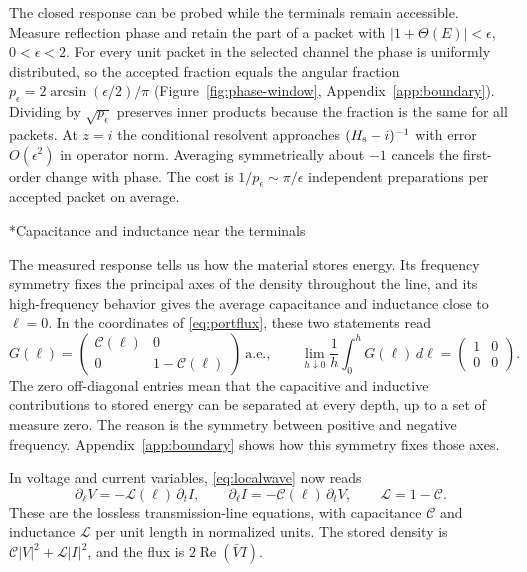 \documentclass[11pt,letterpaper]{article}
\makeatletter
\renewcommand\subsection{\@startsection{subsection}{2}{\z@}{-2.0ex plus -.3ex}{.75ex}{\normalfont\normalsize\itshape}}
\numberwithin{equation}{section}
\makeatother
\begin{document}
The closed response can be probed while the terminals remain accessible. Measure reflection phase and retain the part of a packet with $|1+\Theta(E)|<\epsilon$, $0<\epsilon<2$. For every unit packet in the selected channel the phase is uniformly distributed, so the accepted fraction equals the angular fraction $p_\epsilon=2\arcsin(\epsilon/2)/\pi$ (Figure~\ref{fig:phase-window}, Appendix~\ref{app:boundary}). Dividing by $\sqrt{p_\epsilon}$ preserves inner products because the fraction is the same for all packets. At $z=i$ the conditional resolvent approaches $(H_{\rm s}-i)^{-1}$ with error $O(\epsilon^2)$ in operator norm. Averaging symmetrically about $-1$ cancels the first-order change with phase. The cost is $1/p_\epsilon\sim\pi/\epsilon$ independent preparations per accepted packet on average.

\subsection*{Capacitance and inductance near the terminals}

The measured response tells us how the material stores energy. Its frequency symmetry fixes the principal axes of the density throughout the line, and its high-frequency behavior gives the average capacitance and inductance close to $\ell=0$. In the coordinates of \eqref{eq:portflux}, these two statements read
\begin{equation}
 G(\ell)=\begin{pmatrix}\mathcal C(\ell)&0\\0&1-\mathcal C(\ell)\end{pmatrix}
 \ \text{a.e.},\qquad
 \lim_{h\downarrow0}\frac1h\int_0^h G(\ell)\,d\ell
     =\begin{pmatrix}1&0\\0&0\end{pmatrix}.
 \label{eq:medium}
\end{equation}
The zero off-diagonal entries mean that the capacitive and inductive contributions to stored energy can be separated at every depth, up to a set of measure zero. The reason is the symmetry between positive and negative frequency. Appendix~\ref{app:boundary} shows how this symmetry fixes those axes.

In voltage and current variables, \eqref{eq:localwave} now reads
\begin{equation}
 \partial_\ell V=-\mathcal L(\ell)\,\partial_t I,\qquad
 \partial_\ell I=-\mathcal C(\ell)\,\partial_t V,\qquad
 \mathcal L=1-\mathcal C .
 \label{eq:line}
\end{equation}
These are the lossless transmission-line equations, with capacitance $\mathcal C$ and inductance $\mathcal L$ per unit length in normalized units. The stored density is $\mathcal C|V|^2+\mathcal L|I|^2$, and the flux is $2\operatorname{Re}(\bar V I)$.
\end{document}
